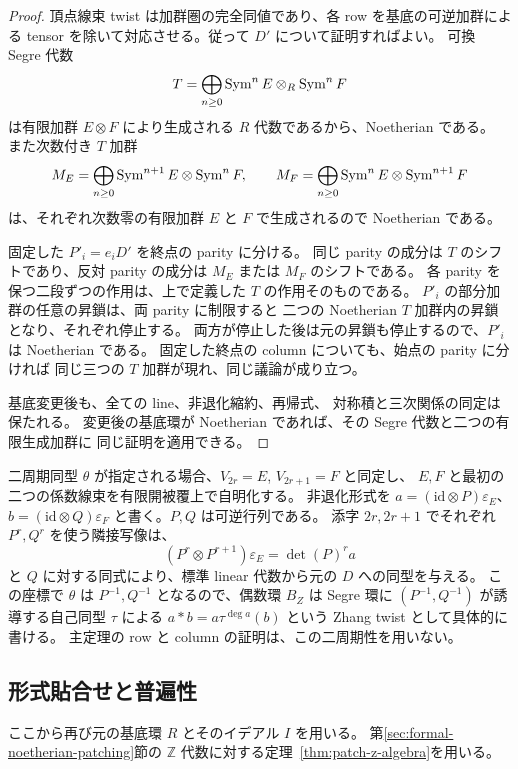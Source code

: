 \begin{proof}
頂点線束 twist は加群圏の完全同値であり、各 row を基底の可逆加群による
tensor を除いて対応させる。従って $D'$ について証明すればよい。
可換 Segre 代数
\[
 T=\bigoplus_{n\geq0}\operatorname{Sym}^nE\otimes_R\operatorname{Sym}^nF
\]
は有限加群 $E\otimes F$ により生成される $R$ 代数であるから、Noetherian である。
また次数付き $T$ 加群
\[
 M_E=\bigoplus_{n\geq0}\operatorname{Sym}^{n+1}E\otimes\operatorname{Sym}^nF,
 \qquad
 M_F=\bigoplus_{n\geq0}\operatorname{Sym}^nE\otimes\operatorname{Sym}^{n+1}F
\]
は、それぞれ次数零の有限加群 $E$ と $F$ で生成されるので Noetherian である。

固定した $P'_i=e_iD'$ を終点の parity に分ける。
同じ parity の成分は $T$ のシフトであり、反対 parity の成分は
$M_E$ または $M_F$ のシフトである。
各 parity を保つ二段ずつの作用は、上で定義した $T$ の作用そのものである。
$P'_i$ の部分加群の任意の昇鎖は、両 parity に制限すると
二つの Noetherian $T$ 加群内の昇鎖となり、それぞれ停止する。
両方が停止した後は元の昇鎖も停止するので、$P'_i$ は Noetherian である。
固定した終点の column についても、始点の parity に分ければ
同じ三つの $T$ 加群が現れ、同じ議論が成り立つ。

基底変更後も、全ての line、非退化縮約、再帰式、
対称積と三次関係の同定は保たれる。
変更後の基底環が Noetherian であれば、その Segre 代数と二つの有限生成加群に
同じ証明を適用できる。
\end{proof}

\begin{remark}
二周期同型 $\theta$ が指定される場合、$V_{2r}=E$, $V_{2r+1}=F$ と同定し、
$E,F$ と最初の二つの係数線束を有限開被覆上で自明化する。
非退化形式を $a=(\mathrm{id}\otimes P)\varepsilon_E$、
$b=(\mathrm{id}\otimes Q)\varepsilon_F$ と書く。$P,Q$ は可逆行列である。
添字 $2r,2r+1$ でそれぞれ $P^r,Q^r$ を使う隣接写像は、
\[
 (P^r\otimes P^{r+1})\varepsilon_E=\det(P)^r a
\]
と $Q$ に対する同式により、標準 linear 代数から元の $D$ への同型を与える。
この座標で $\theta$ は $P^{-1},Q^{-1}$ となるので、偶数環 $B_Z$ は
Segre 環に $(P^{-1},Q^{-1})$ が誘導する自己同型 $\tau$ による
$a*b=a\tau^{\deg a}(b)$ という Zhang twist として具体的に書ける。
主定理の row と column の証明は、この二周期性を用いない。
\end{remark}

\subsection{形式貼合せと普遍性}

ここから再び元の基底環 $R$ とそのイデアル $I$ を用いる。
第\ref{sec:formal-noetherian-patching}節の $\mathbb Z$ 代数に対する定理~\ref{thm:patch-z-algebra}を用いる。

